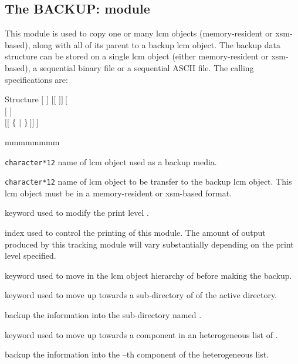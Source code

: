 \clearpage

\subsection{The BACKUP: module}\label{sect:BACKUPData}

This module is used to copy one or many {\sc lcm} objects (memory-resident or {\sc xsm}-based), along with all of its parent to a backup {\sc lcm} object. The backup data
structure can be stored on a single {\sc lcm} object (either memory-resident or {\sc xsm}-based), a sequential binary
file or a sequential ASCII file. The calling specifications are:

\begin{DataStructure}{Structure }
 \moc{:=}  $[$  $]$ $[[$  $]]~[$ \moc{::} \\
 $[$   $]$ \\
 $[[$  $\{$   $|$   $\}~]]~]$ \moc{;}
\end{DataStructure}

\begin{ListeDeDescription}{mmmmmmmm}

\item[\dusa{NAME1}] {\tt character*12} name of {\sc lcm} object used as a
backup media.

\item[\dusa{NAME2}] {\tt character*12} name of {\sc lcm} object
to be transfer to the backup {\sc lcm} object. This {\sc lcm} object must be in a
memory-resident or {\sc xsm}-based format.

\item[\moc{EDIT}] keyword used to modify the print level .

\item[\dusa{iprint}] index used to control the printing of this module. The
amount of output produced by this tracking module will vary substantially
depending on the print level specified.

\item[\moc{STEP}] keyword used to move in the {\sc lcm} object hierarchy of  before making the backup.

\item[\moc{UP}] keyword used to move up towards a sub-directory of  of the
active directory.

\item[\dusa{NOMDIR}] backup the information into the sub-directory named .

\item[\moc{AT}] keyword used to move up towards a component in an heterogeneous list of .

\item[\dusa{index}] backup the information into the --th component of the heterogeneous list.

\end{ListeDeDescription}

